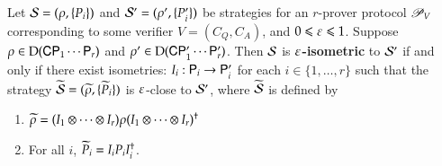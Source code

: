 \begin{definition}
	Let $\mathcal{S} = (\rho,\{P_i\})$ and $\mathcal{S}' = (\rho',\{P_i'\})$ be strategies for an $r$-prover protocol $\mathscr{P}_V$ corresponding to some verifier $V = (C_Q,C_A)$, and $0\leqslant \varepsilon\leqslant 1$. Suppose $\rho \in \mathrm{D}({\mathsf{C}} {\mathsf{P}}_1 \cdots {\mathsf{P}}_r)$ and $\rho' \in \mathrm{D}({\mathsf{C}} {\mathsf{P}}_1' \cdots {\mathsf{P}}_r')$. Then $\mathcal{S}$ is \textbf{$\varepsilon$-isometric} to $\mathcal{S}'$ if and only if there exist isometries: $I_i : {\mathsf{P}}_i \to {\mathsf{P}}_i'$ for each $i\in\{1,\ldots,r\}$ such that the strategy $\widetilde{\mathcal{S}} = (\widetilde{\rho}, \{ \widetilde{P}_i \})$ is $\varepsilon$-close to $\mathcal{S}'$, where $\widetilde{\mathcal{S}}$ is defined by
	\begin{enumerate}
		\item $\widetilde{\rho} = (I_1 \otimes \cdots \otimes I_r) \rho (I_1 \otimes \cdots \otimes I_r)^\dagger$
		\item For all $i$, $\widetilde{P}_i = I_i P_i I_i^\dagger$.
	\end{enumerate}
\end{definition}


